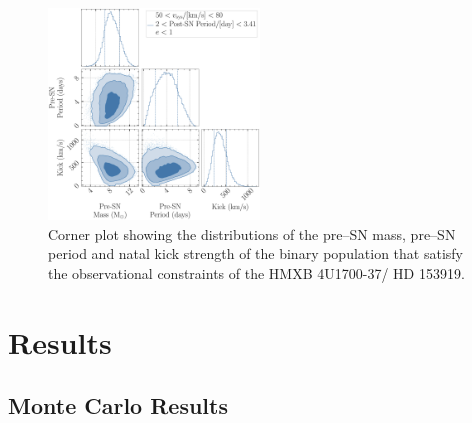 \documentclass[linenumbers,trackchanges,twocolumn]{aastex701}
\newcommand{\red}{\textcolor{red}}
\begin{document}
\begin{figure}[htbp]
    \centering
    \includegraphics[width=0.5\textwidth]{xrb-monte-carlo-mass-period-kick.pdf}
    \caption{Corner plot showing the distributions of the pre--SN mass, pre--SN period and natal kick strength of the binary population that satisfy the observational constraints of the HMXB 4U1700-37/ HD 153919.}
    \label{fig:xrb_monte_carlo}
\end{figure}

\section{Results}

\subsection{Monte Carlo Results} \label{sec:monte_carlo}

\end{document}
